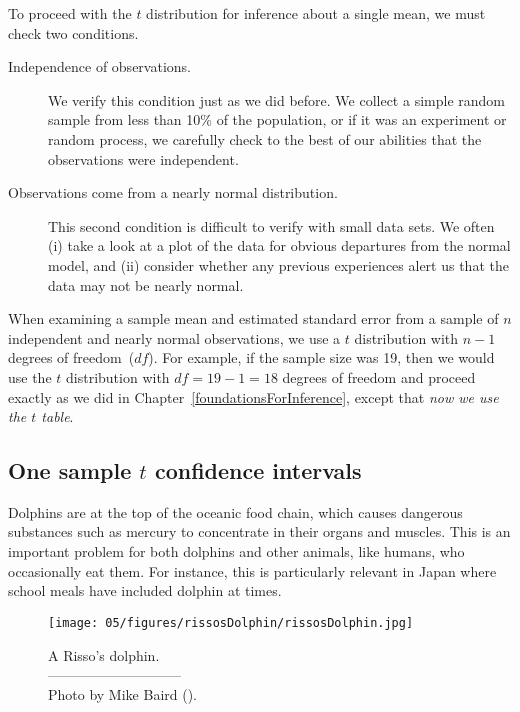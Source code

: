 
To proceed with the $t$ distribution for inference about a single mean, we must check two conditions.
\begin{description}
\item[Independence of observations.] We verify this condition just as we did before. We collect a simple random sample from less than 10\% of the population, or if it was an experiment or random process, we carefully check to the best of our abilities that the observations were independent.
\item[Observations come from a nearly normal distribution.] This second condition is difficult to verify with small data sets. We often (i) take a look at a plot of the data for obvious departures from the normal model, and (ii) consider whether any previous experiences alert us that the data may not be nearly normal.
\end{description}
When examining a sample mean and estimated standard error from a sample of $n$ independent and nearly normal observations, we use a $t$ distribution with $n-1$ degrees of freedom~($df$). For example, if the sample size was 19, then we would use the $t$ distribution with $df=19-1=18$ degrees of freedom and proceed exactly as we did in Chapter~\ref{foundationsForInference}, except that \emph{now we use the $t$ table}.


\subsection{One sample $t$ confidence intervals}
\label{oneSampleTConfidenceIntervals}

Dolphins are at the top of the oceanic food chain, which causes dangerous substances such as mercury to concentrate in their organs and muscles. This is an important problem for both dolphins and other animals, like humans, who occasionally eat them. For instance, this is particularly relevant in Japan where school meals have included dolphin at times.
\setlength{\captionwidth}{71.5mm}

\begin{figure}[h]
\centering
\texttt{[image: 05/figures/rissosDolphin/rissosDolphin.jpg]}  \\
\addvspace{2mm}
\begin{minipage}{\textwidth}
   \caption[rissosDolphinPic]{A Risso's dolphin.\vspace{-1mm} \\
   -----------------------------\vspace{-2mm}\\
   {\footnotesize Photo by Mike Baird ().%
}\vspace{-8mm}}
   \label{rissosDolphin}
\end{minipage}
\vspace{3mm}
\end{figure}
\setlength{\captionwidth}{\mycaptionwidth}

